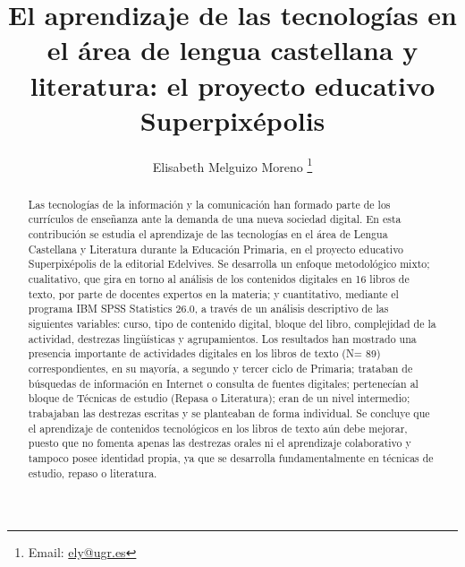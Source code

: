 \documentclass{textolivre}
\title{El aprendizaje de las tecnologías en el área de lengua castellana y literatura: el proyecto educativo Superpixépolis}
\author[1]{Elisabeth Melguizo Moreno \orcid{0000-0001-6964-964X} \thanks{Email: \url{ely@ugr.es}}}
\affil[1]{Universidad de Granada, Espanha.}
\begin{document}
\maketitle

\begin{polyabstract}
\begin{abstract}
Las tecnologías de la información y la comunicación han formado parte de los currículos de enseñanza ante la demanda de una nueva sociedad digital. En esta contribución se estudia el aprendizaje de las tecnologías en el área de Lengua Castellana y Literatura durante la Educación Primaria, en el proyecto educativo Superpixépolis de la editorial Edelvives. Se desarrolla un enfoque metodológico mixto; cualitativo, que gira en torno al análisis de los contenidos digitales en 16 libros de texto, por parte de docentes expertos en la materia; y cuantitativo, mediante el programa IBM SPSS Statistics 26.0, a través de un análisis descriptivo de las siguientes variables: curso, tipo de contenido digital, bloque del libro, complejidad de la actividad, destrezas lingüísticas y agrupamientos. Los resultados han mostrado una presencia importante de actividades digitales en los libros de texto (N= 89) correspondientes, en su mayoría, a segundo y tercer ciclo de Primaria; trataban de búsquedas de información en Internet o consulta de fuentes digitales; pertenecían al bloque de Técnicas de estudio (Repasa o Literatura); eran de un nivel intermedio; trabajaban las destrezas escritas y se planteaban de forma individual. Se concluye que el aprendizaje de contenidos tecnológicos en los libros de texto aún debe mejorar, puesto que no fomenta apenas las destrezas orales ni el aprendizaje colaborativo y tampoco posee identidad propia, ya que se desarrolla fundamentalmente en técnicas de estudio, repaso o literatura.

\end{abstract}


\end{polyabstract}
\end{document}

